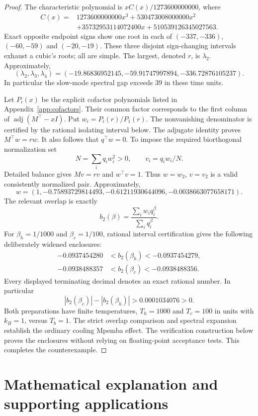 \documentclass[11pt]{article}
\begin{document}
\begin{proof}
The characteristic polynomial is $xC(x)/1273600000000$, where
\begin{align*}
C(x)={}&1273600000000x^3+530473008000000x^2\\
&+35732953114072400x+510539126345027563.
\end{align*}
Exact opposite endpoint signs show one root in each of $(-337,-336)$, $(-60,-59)$ and $(-20,-19)$. These three disjoint sign-changing intervals exhaust a cubic's roots; all are simple. The largest, denoted $r$, is $\lambda_2$. Approximately,
\[
(\lambda_2,\lambda_3,\lambda_4)=(-19.86836952145,-59.91747997894,-336.72876105237).
\]
In particular the slow-mode spectral gap exceeds 39 in these time units.

Let $P_i(x)$ be the explicit cofactor polynomials listed in Appendix~\ref{app:cofactors}. Their common factor corresponds to the first column of $\operatorname{adj}(M^\top-xI)$. Put $w_i=P_i(r)/P_1(r)$. The nonvanishing denominator is certified by the rational isolating interval below. The adjugate identity proves $M^\top w=rw$. It also follows that $q^\top w=0$. To impose the required biorthogonal normalization set
\[
N=\sum_iq_iw_i^2>0,\qquad v_i=q_iw_i/N.
\]
Detailed balance gives $Mv=rv$ and $w^\top v=1$. Thus $w=w_2$, $v=v_2$ is a valid consistently normalized pair. Approximately,
\[
w=(1,-0.75893729814493,-0.61211930644096,-0.0038663077658171).
\]
The relevant overlap is exactly
\[
b_2(\beta)=\frac{\sum_iw_iq_i^\beta}{\sum_iq_i^\beta}.
\]
For $\beta_h=1/1000$ and $\beta_c=1/100$, rational interval certification gives the following deliberately widened enclosures:
\begin{align*}
-0.0937454280&<b_2(\beta_h)<-0.0937454279,\\
-0.0938488357&<b_2(\beta_c)<-0.0938488356.
\end{align*}
Every displayed terminating decimal denotes an exact rational number. In particular
\[
|b_2(\beta_c)|-|b_2(\beta_h)|>0.0001034076>0.
\]
Both preparations have finite temperatures, $T_h=1000$ and $T_c=100$ in units with $k_B=1$, versus $T_b=1$. The strict overlap comparison and spectral expansion establish the ordinary cooling Mpemba effect. The verification construction below proves the enclosures without relying on floating-point acceptance tests. This completes the counterexample.
\end{proof}

\section{Mathematical explanation and supporting applications}
\end{document}
